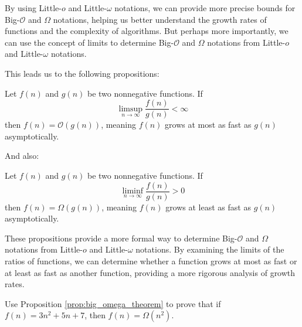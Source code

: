         By using Little-$o$ and Little-$\omega$ notations, we can provide more precise bounds for Big-$\mathcal{O}$ and $\Omega$ notations, helping us better understand the growth rates of functions and the complexity of algorithms. But perhaps more importantly, we can use the concept of limits to determine Big-$\mathcal{O}$ and $\Omega$ notations from Little-$o$ and Little-$\omega$ notations.

        This leads us to the following propositions:

        \begin{proposition} \label{prop:big_o_theorem}
            Let \( f(n) \) and \( g(n) \) be two nonnegative functions. If
            \medskip
            \[
            \limsup_{n \rightarrow \infty} \frac{f(n)}{g(n)} < \infty
            \]
            \medskip
            then \( f(n) = \mathcal{O}(g(n)) \), meaning \( f(n) \) grows at most as fast as \( g(n) \) asymptotically.
        \end{proposition}
        
        And also:


        \begin{proposition} \label{prop:big_omega_theorem}
            Let \( f(n) \) and \( g(n) \) be two nonnegative functions. If
            \medskip
            \[
            \liminf_{n \rightarrow \infty} \frac{f(n)}{g(n)} > 0
            \]
            \medskip
            then \( f(n) = \Omega(g(n)) \), meaning \( f(n) \) grows at least as fast as \( g(n) \) asymptotically.
        \end{proposition}
        
        These propositions provide a more formal way to determine Big-$\mathcal{O}$ and $\Omega$ notations from Little-$o$ and Little-$\omega$ notations. By examining the limits of the ratios of functions, we can determine whether a function grows at most as fast or at least as fast as another function, providing a more rigorous analysis of growth rates.
            
            \begin{example}
            Use Proposition \ref{prop:big_omega_theorem} to prove that if \( f(n) = 3n^2 + 5n + 7 \), then \( f(n) = \Omega(n^2) \).
            \end{example}
            
